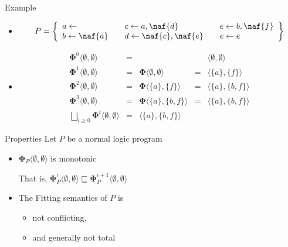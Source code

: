 \begin{frame}{Example}
  \begin{itemize}
  \item<1-> []
    \[
    P
    =
    \left\{
      \begin{array}{lll}
        a \leftarrow                  \quad &
        c \leftarrow a, \naf{d}       \quad &
        e \leftarrow b, \naf{f}
        \\
        b \leftarrow \naf{a}          \quad &
        d \leftarrow \naf{c}, \naf{e} \quad &
        e \leftarrow e
      \end{array}
    \right\}
    \]

  \item<2-> []
    \[
    \begin{array}{rclcl}
      \mathbf{\Phi}^0\langle\emptyset,\emptyset\rangle&=&                                              & &\langle\emptyset,\emptyset\rangle
      \\
      \mathbf{\Phi}^1\langle\emptyset,\emptyset\rangle&=&\mathbf{\Phi}\langle\emptyset,\emptyset\rangle&=&\langle\{a\}    ,\{f\}    \rangle
      \\
      \mathbf{\Phi}^2\langle\emptyset,\emptyset\rangle&=&\mathbf{\Phi}\langle\{a\}    ,\{f\}    \rangle&=&\langle\{a\}    ,\{b,f\}  \rangle
      \\
      \mathbf{\Phi}^3\langle\emptyset,\emptyset\rangle&=&\mathbf{\Phi}\langle\{a\}    ,\{b,f\}  \rangle&=&\langle\{a\}    ,\{b,f\}  \rangle%
      \\[10pt]
      \bigsqcup_{i \geq 0}\mathbf{\Phi}^i\langle\emptyset,\emptyset\rangle&=&\langle \{a\}, \{b,f\} \rangle
    \end{array}
    \]
  \end{itemize}
\end{frame}
\begin{frame}{Properties}
  \bigskip
  Let $P$ be a normal logic program
  \medskip
  \begin{itemize}
  \item ${\mathbf{\Phi}}_P\langle \emptyset, \emptyset \rangle$ is monotonic

    That is,
    \(
    {\mathbf{\Phi}}_P^i\langle \emptyset, \emptyset \rangle
    \sqsubseteq
    {\mathbf{\Phi}}_P^{i+1}\langle \emptyset, \emptyset \rangle
    \)
    \smallskip
  \item The Fitting semantics of $P$ is
    \begin{itemize}
    \item not conflicting,
    \item and generally not total
    \end{itemize}
  \end{itemize}
\end{frame}
